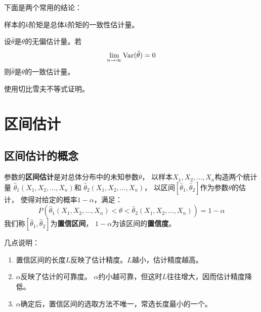 下面是两个常用的结论：

\begin{theorem}
  样本的$k$阶矩是总体$k$阶矩的一致性估计量。
\end{theorem}

\begin{theorem}
  设$\hat{\theta}$是$\theta$的无偏估计量。若
  \begin{displaymath}
    \lim_{n\to\infty}\textrm{Var}(\hat{\theta})=0
  \end{displaymath}
  则$\hat{\theta}$是$\theta$的一致估计量。
\end{theorem}

\begin{remark}
  使用切比雪夫不等式证明。
\end{remark}

\section{区间估计}

\subsection{区间估计的概念}
参数的\textbf{区间估计}是对总体分布中的未知参数$\theta$，
以样本$X_1,X_2,\dots,X_n$构造两个统计量
$\hat{\theta}_1(X_1,X_2,\dots,X_n)$和
$\hat{\theta}_2(X_1,X_2,\dots,X_n)$，
以区间$[\hat{\theta}_1,\hat{\theta}_2]$作为参数$\theta$的估计，
使得对给定的概率$1-\alpha$，满足：
\begin{displaymath}
  P\left(\hat{\theta}_1(X_1,X_2,\dots,X_n) < \theta <
    \hat{\theta}_2(X_1,X_2,\dots,X_n)\right) = 1-\alpha
\end{displaymath}
我们称$[\hat{\theta}_1,\hat{\theta}_2]$为\textbf{置信区间}，
$1-\alpha$为该区间的\textbf{置信度}。

几点说明：
\begin{enumerate}
  \item
  置信区间的长度$L$反映了估计精度。$L$越小，估计精度越高。
  \item
  $\alpha$反映了估计的可靠度。
  $\alpha$约小越可靠，但这时$L$往往增大，因而估计精度降低。
  \item
  $\alpha$确定后，置信区间的选取方法不唯一，常选长度最小的一个。
\end{enumerate}

